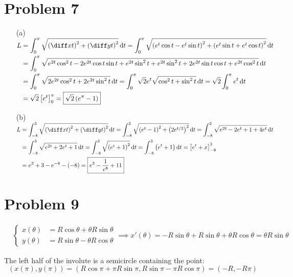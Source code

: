 \documentclass[preview, margin=0.6in]{standalone}
\newcommand*{\problem}[1]{\section*{Problem #1}}
\begin{document}
\problem{7}
\begin{itemize}
\item[(a)]
$\begin{aligned}[t]
    L 
	&=\int_{0}^{\pi}\sqrt{\left(\diff xt\right)^2+\left(\diff yt\right)^2}\,\mathrm{d}t
	=\int_{0}^{\pi}\sqrt{\left(e^t\cos t-e^t\sin t\right)^2+\left(e^t\sin t+e^t\cos t\right)^2}\,\mathrm{d}t \\
	&=\int_{0}^{\pi}\sqrt{e^{2t}\cos^2t-2e^{2t}\cos t\sin t+e^{2t}\sin^2 t+e^{2t}\sin^2t+2e^{2t}\sin t\cos t+e^{2t}\cos^2 t}\,\mathrm{d}t \\
	&=\int_{0}^{\pi}\sqrt{2e^{2t}\cos^2t+2e^{2t}\sin^2 t}\,\mathrm{d}t
	=\int_{0}^{\pi}\sqrt{2}e^t \sqrt{\cos^2t+\sin^2t}\,\mathrm{d}t
	=\sqrt{2}\int_{0}^{\pi}e^t\,\mathrm{d}t \\
	&=\sqrt{2}\left[e^t\right]_{0}^{\pi}
	=\boxed{\sqrt{2}\left(e^{\pi}-1\right)}
\end{aligned}$

\item[(b)]
$\begin{aligned}[t]
    L 
	&=\int_{-8}^{3}\sqrt{\left(\diff xt\right)^2+\left(\diff yt\right)^2}\,\mathrm{d}t
	= \int_{-8}^{3}\sqrt{\left(e^t-1\right)^2+\left(2e^{t/2}\right)^2}\,\mathrm{d}t
	=\int_{-8}^{3}\sqrt{e^{2t}-2e^t+1+4e^t}\,\mathrm{d}t \\
	&= \int_{-8}^{3}\sqrt{e^{2t}+2e^t+1}\,\mathrm{d}t
	=\int_{-8}^{3}\sqrt{\left(e^t+1\right)^2}\,\mathrm{d}t
	=\int_{-8}^{3}\left(e^t+1\right)\mathrm{d}t
	=\left[e^t+x\right]_{-8}^{3} \\
	&=e^3+3-e^{-8}-(-8)
	=\boxed{e^3-\frac{1}{e^8}+11}
\end{aligned}$

\end{itemize}

\problem{9}
\begin{align*}
	&\left\{\begin{aligned}
		x(\theta)&=R\cos \theta+\theta R\sin \theta \\
		y(\theta)&=R\sin \theta-\theta R\cos \theta
	\end{aligned}\right.
	\implies
	x'(\theta)
	=-R\sin \theta+R\sin \theta+\theta R\cos \theta
	=\theta R\sin \theta
\end{align*}

The left half of the involute is a semicircle containing the point:
\begin{equation*}
	(x(\pi),y(\pi))
	=\left(R\cos \pi+\pi R\sin \pi, R\sin \pi-\pi R\cos \pi\right)
	=\left(-R, -R\pi\right)
\end{equation*}
\end{document}
